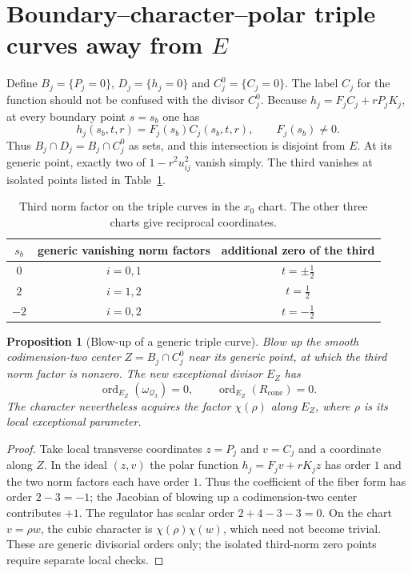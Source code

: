 \documentclass[12pt,letterpaper]{amsart}
\DeclareMathOperator{\ord}{ord}
\newtheorem{proposition}[theorem]{Proposition}
\begin{document}
\section{Boundary--character--polar triple curves away from $E$}
Define $B_j=\{P_j=0\}$, $D_j=\{h_j=0\}$ and $C_j^0=\{C_j=0\}$. The label $C_j$ for the function should not be confused with the divisor $C_j^0$. Because $h_j=F_jC_j+rP_jK_j$, at every boundary point $s=s_b$ one has
\begin{equation}\label{eq:triple}
 h_j(s_b,t,r)=F_j(s_b)C_j(s_b,t,r),\qquad F_j(s_b)\ne0.
\end{equation}
Thus $B_j\cap D_j=B_j\cap C_j^0$ as sets, and this intersection is disjoint from $E$. At its generic point, exactly two of $1-r^2u_{ij}^2$ vanish simply. The third vanishes at isolated points listed in Table~\ref{tab:third}.
\begin{table}[ht]
\centering\caption{Third norm factor on the triple curves in the $x_0$ chart. The other three charts give reciprocal coordinates.}\label{tab:third}
\begin{tabular}{ccc}\toprule
$s_b$&generic vanishing norm factors&additional zero of the third\\\midrule
$0$&$i=0,1$&$t=\pm\tfrac12$\\
$2$&$i=1,2$&$t=\tfrac12$\\
$-2$&$i=0,2$&$t=-\tfrac12$\\\bottomrule
\end{tabular}
\end{table}
\begin{proposition}[Blow-up of a generic triple curve]\label{prop:trip}
Blow up the smooth codimension-two center $Z=B_j\cap C_j^0$ near its generic point, at which the third norm factor is nonzero. The new exceptional divisor $E_Z$ has
\[
 \ord_{E_Z}(\omega_{\mathcal Q_3})=0,
 \qquad \ord_{E_Z}(R_{\mathrm{cone}})=0.
\]
The character nevertheless acquires the factor $\chi(\rho)$ along $E_Z$, where $\rho$ is its local exceptional parameter.
\end{proposition}
\begin{proof}
Take local transverse coordinates $z=P_j$ and $v=C_j$ and a coordinate along $Z$. In the ideal $(z,v)$ the polar function $h_j=F_jv+rK_jz$ has order $1$ and the two norm factors each have order $1$. Thus the coefficient of the fiber form has order $2-3=-1$; the Jacobian of blowing up a codimension-two center contributes $+1$. The regulator has scalar order $2+4-3-3=0$. On the chart $v=\rho w$, the cubic character is $\chi(\rho)\chi(w)$, which need not become trivial. These are generic divisorial orders only; the isolated third-norm zero points require separate local checks.
\end{proof}
\end{document}
